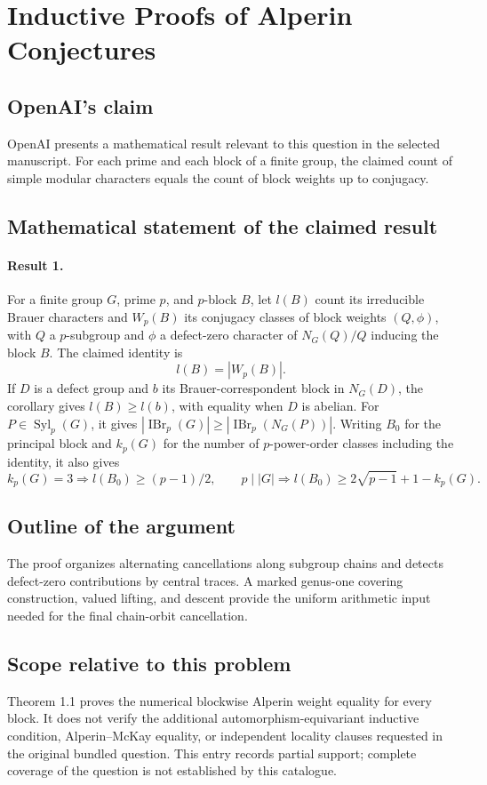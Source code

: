 \documentclass[11pt]{article}
\begin{document}
\section*{Inductive Proofs of Alperin Conjectures}

\subsection{OpenAI's claim}
OpenAI presents a mathematical result relevant to this question in the selected manuscript. For each prime and each block of a finite group, the claimed count of simple modular characters equals the count of block weights up to conjugacy.

\subsection{Mathematical statement of the claimed result}
\paragraph{Result 1.} For a finite group \(G\), prime \(p\), and \(p\)-block \(B\), let \(l(B)\) count its irreducible Brauer characters and \(W_p(B)\) its conjugacy classes of block weights \((Q,\phi)\), with \(Q\) a \(p\)-subgroup and \(\phi\) a defect-zero character of \(N_G(Q)/Q\) inducing the block \(B\). The claimed identity is
\[
 l(B)=|W_p(B)|.
\]
If \(D\) is a defect group and \(b\) its Brauer-correspondent block in \(N_G(D)\), the corollary gives \(l(B)\ge l(b)\), with equality when \(D\) is abelian. For \(P\in\operatorname{Syl}_p(G)\), it gives \(|\operatorname{IBr}_p(G)|\ge|\operatorname{IBr}_p(N_G(P))|\). Writing \(B_0\) for the principal block and \(k_p(G)\) for the number of \(p\)-power-order classes including the identity, it also gives
\[
 k_p(G)=3\Rightarrow l(B_0)\ge(p-1)/2,\qquad
 p\mid|G|\Rightarrow l(B_0)\ge2\sqrt{p-1}+1-k_p(G).
\]

\subsection{Outline of the argument}
The proof organizes alternating cancellations along subgroup chains and detects defect-zero contributions by central traces. A marked genus-one covering construction, valued lifting, and descent provide the uniform arithmetic input needed for the final chain-orbit cancellation.

\subsection{Scope relative to this problem}
Theorem 1.1 proves the numerical blockwise Alperin weight equality for every block. It does not verify the additional automorphism-equivariant inductive condition, Alperin–McKay equality, or independent locality clauses requested in the original bundled question. This entry records partial support; complete coverage of the question is not established by this catalogue.
\end{document}
